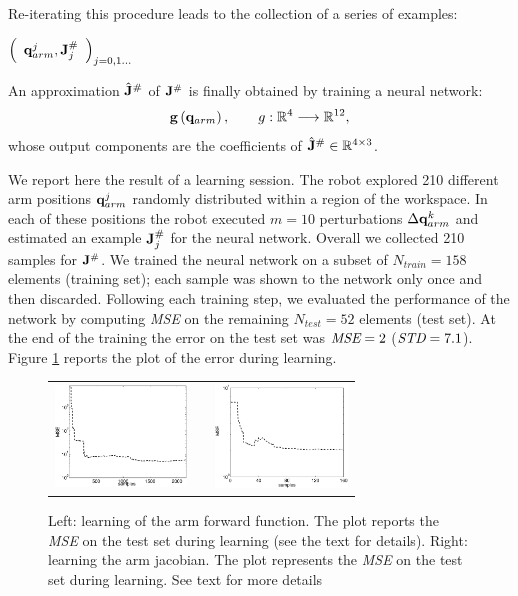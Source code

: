 Re-iterating this procedure leads to the collection of a series of examples:
%
\begin{center}
\begin{math}
  \left(\begin{array}{cc}
    \mathbf q_{arm}^j , \mathbf J_j^\# \end{array}\right)_{j = 0,1\dots}
\end{math}
\end{center}
%
An approximation $\hat{\mathbf J}^\#$ of $\mathbf J^\#$ is finally
obtained by training a neural network:
%
\begin{equation}
\mathbf{g}\left(\mathbf q_{arm}\right), \qquad g : \mathbb R^4 \longrightarrow \mathbb R^{12},
\end{equation}
%
whose output components are the coefficients of 
$\hat{\mathbf J}^\# \in \mathbb R^{4 \times 3}$.

We report here the result of a learning session. The robot explored 210 
different arm positions $\mathbf q_{arm}^j$ randomly distributed within a region of 
the workspace. In each of these positions the robot executed $m=10$ 
perturbations $\Delta \mathbf {q}_{arm}^k$ and estimated an example $\mathbf J^\#_j$ for 
the neural network. Overall we collected 210 samples for $\mathbf J^\#$. 
We trained the neural network on a subset of $N_{train}=158$ elements 
(training set); each 
sample was shown to the network only once and then discarded. Following each 
training step, we evaluated the performance of the network by computing 
\emph{MSE} on the remaining $N_{test}=52$ elements 
(test set). At the 
end of the training the error on the test set was $\emph{MSE}=2$ 
($\emph{STD}=7.1$). Figure \ref{Fig:learningerrors} reports the plot of 
the error during learning.
%
\begin{figure}
  \begin{center}
	\begin{tabular}{ccc}
	  \parbox{30mm}{\includegraphics[width=35mm]{./Figure/reachingError1.eps}}  & \hspace{.1cm} &
	  \parbox{30mm}{\includegraphics[width=35mm]{./Figure/jacobian-error.eps}}
  \end{tabular}
\end{center}
\caption{Left: learning of the arm forward function. The plot reports the 
\emph{MSE} on the test set during learning (see the text for details). 
Right: learning the arm jacobian. The plot represents the \emph{MSE} on 
the test set during learning. See text for more details}\label{Fig:learningerrors}
\end{figure}

